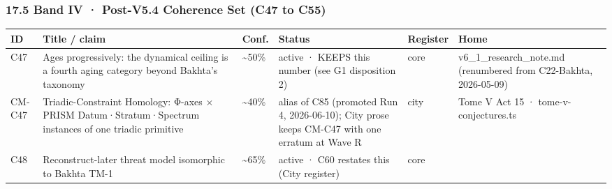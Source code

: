 \documentclass[
  11pt,
]{article}
\newcounter{none} %
\begin{document}
\subsubsection{17.5 Band IV · Post-V5.4 Coherence Set (C47 to
C55)}\label{band-iv-post-v5.4-coherence-set-c47-to-c55}

{\def\LTcaptype{none} %
\begin{longtable}[]{@{}
  >{\raggedright\arraybackslash}p{}
  >{\raggedright\arraybackslash}p{}
  >{\raggedright\arraybackslash}p{}
  >{\raggedright\arraybackslash}p{}
  >{\raggedright\arraybackslash}p{}
  >{\raggedright\arraybackslash}p{}@{}}
\toprule\noalign{}
\begin{minipage}[b]{\linewidth}\raggedright
ID
\end{minipage} & \begin{minipage}[b]{\linewidth}\raggedright
Title / claim
\end{minipage} & \begin{minipage}[b]{\linewidth}\raggedright
Conf.
\end{minipage} & \begin{minipage}[b]{\linewidth}\raggedright
Status
\end{minipage} & \begin{minipage}[b]{\linewidth}\raggedright
Register
\end{minipage} & \begin{minipage}[b]{\linewidth}\raggedright
Home
\end{minipage} \\
\midrule\noalign{}
\endhead
\bottomrule\noalign{}
\endlastfoot
C47 & Ages progressively: the dynamical ceiling is a fourth aging
category beyond Bakhta's taxonomy & \textasciitilde50\% & active · KEEPS
this number (see G1 disposition 2) & core & v6\_1\_research\_note.md
(renumbered from C22-Bakhta, 2026-05-09) \\
CM-C47 & Triadic-Constraint Homology: Φ-axes × PRISM
Datum·Stratum·Spectrum instances of one triadic primitive &
\textasciitilde40\% & alias of C85 (promoted Run 4, 2026-06-10); City
prose keeps CM-C47 with one erratum at Wave R & city & Tome V Act 15 ·
tome-v-conjectures.ts \\
C48 & Reconstruct-later threat model isomorphic to Bakhta TM-1 &
\textasciitilde65\% & active · C60 restates this (City register) & core

\end{longtable}}
\end{document}
